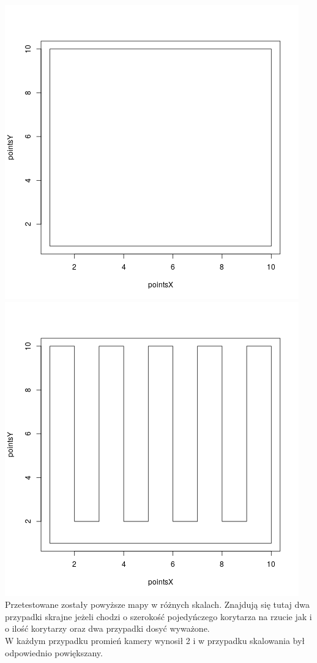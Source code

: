 \documentclass[12pt,a4paper]{article}
\begin{document}
\includegraphics[scale=0.4]{openSpace.png}
\includegraphics[scale=0.4]{slimLines.png} \\
Przetestowane zostały powyższe mapy w różnych skalach.
Znajdują się tutaj dwa przypadki skrajne jeżeli chodzi o szerokość pojedyńczego
korytarza na rzucie jak i o ilość korytarzy oraz dwa przypadki dosyć wyważone. \\
W każdym przypadku promień kamery wynosił 2 i w przypadku skalowania
był odpowiednio powiększany.
\end{document}
